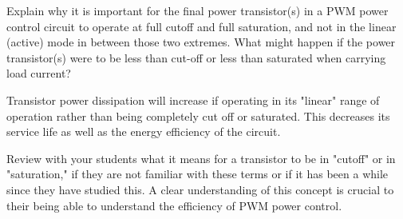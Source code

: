 

Explain why it is important for the final power transistor(s) in a PWM power control circuit to operate at full cutoff and full saturation, and not in the linear (active) mode in between those two extremes.  What might happen if the power transistor(s) were to be less than cut-off or less than saturated when carrying load current?







Transistor power dissipation will increase if operating in its "linear" range of operation rather than being completely cut off or saturated.  This decreases its service life as well as the energy efficiency of the circuit.







Review with your students what it means for a transistor to be in "cutoff" or in "saturation," if they are not familiar with these terms or if it has been a while since they have studied this.  A clear understanding of this concept is crucial to their being able to understand the efficiency of PWM power control.




